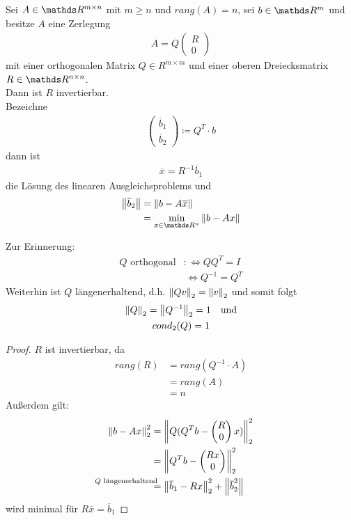 \begin{Satze}
	Sei $A\in \R^{m\times n} $ mit $m\geq n$ und $rang(A) = n$,
	sei $b\in\R^m$ und besitze $A$ eine Zerlegung
	\begin{gather*}
	A= Q\begin{pmatrix}R\\0\end{pmatrix}
	\end{gather*}
	mit einer orthogonalen Matrix $Q\in R^{m\times m}$ und 
	einer oberen Dreiecksmatrix $R\in \R^{n\times n}$. \\
	Dann ist $R$ invertierbar. \\
	Bezeichne 
	\begin{gather}
	\begin{pmatrix} \overline{b}_1 \\ \overline{b}_2\end{pmatrix}
	\coloneqq Q^T\cdot b
	\label{IV.3.9}
	\end{gather}
	dann ist
	\begin{gather}
	\overline{x} = R^{-1} \overline{b}_1 
	\label{IV.3.10}
	\end{gather}
	die Lösung des linearen Ausgleichsproblems und
	\begin{align*}
	\nn{\overline{b}_2} &= \nn{b-A\overline{x}} \\
	& = \min_{x\in \Ren }\nn{b-Ax}
	\end{align*}
\end{Satze}

Zur Erinnerung:
\begin{align*}
Q \text{ orthogonal} &:\Leftrightarrow QQ^T = I \\
&\, \Leftrightarrow Q^{-1} = Q^T
\end{align*}
Weiterhin ist $Q$ längenerhaltend, d.h. $\left\| Qv \right\|_2 = \left\| v \right\|_2$ 
und somit folgt
\begin{gather}
\nonumber
\left\| Q \right\|_2 = \left\| Q^{-1} \right\|_2 = 1 \quad \text{und} \\
cond_2(Q) = 1
\label{IV.3.11}
\end{gather}

\begin{proof} $R$ ist invertierbar, da 
	\begin{align*}
	rang(R) &= rang(Q^{-1}\cdot A) \\	
	& = rang(A) \\
	&= n
	\end{align*}
	Außerdem gilt:
	\begin{align*}
	\nn{b-Ax}_2^2 & = \nn{Q(Q^Tb-\begin{pmatrix}R\\0\end{pmatrix}x)}_2^2 \\
	&=  \nn{Q^Tb-\begin{pmatrix}Rx\\0\end{pmatrix}}_2^2  \\
	&\overset{\mathllap{\text{$Q$ längenerhaltend}}}{=}
	\nn{\overline{b}_1 - Rx}_2^2  + \nn{\overline{b}_2^2}
	\end{align*}
	wird minimal für $R\overline{x} = \overline{b}_1$
\end{proof}

